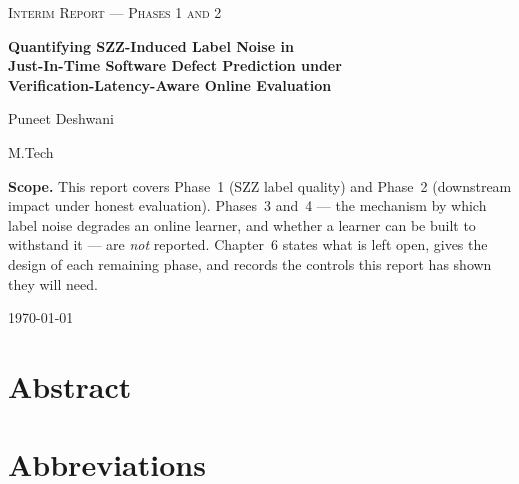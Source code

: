 \documentclass[12pt,a4paper,oneside]{report}
\begin{document}
\begin{titlepage}
\centering
\vspace*{1.6cm}
{\large\scshape Interim Report --- Phases 1 and 2\par}
\vspace{1.4cm}
{\LARGE\bfseries Quantifying SZZ-Induced Label Noise in\\[0.3em]
 Just-In-Time Software Defect Prediction under\\[0.3em]
 Verification-Latency-Aware Online Evaluation\par}
\vspace{2.2cm}
{\Large Puneet Deshwani\par}
\vspace{0.5cm}
{\large M.Tech\par}
\vspace{1.6cm}
\begin{minipage}{0.82\linewidth}\small{}
\textbf{Scope.} This report covers Phase~1 (SZZ label quality) and Phase~2
(downstream impact under honest evaluation). Phases~3 and~4 --- the mechanism
by which label noise degrades an online learner, and whether a learner can be
built to withstand it --- are \emph{not} reported. Chapter~6 states what is
left open, gives the design of each remaining phase, and records the controls
this report has shown they will need.
\end{minipage}
\vfill
{\large \today\par}
\end{titlepage}

\setcounter{page}{1}

\chapter*{Abstract}


\chapter*{Abbreviations}


\tableofcontents
\listoffigures

\cleardoublepage
{}
\setcounter{page}{1}








\cleardoublepage
{}

\end{document}
